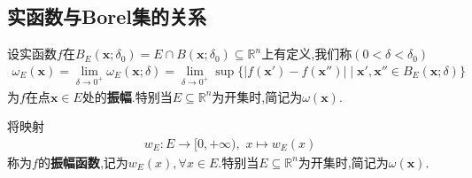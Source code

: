 \documentclass[../../main.tex]{subfiles}%
\begin{document}
\subsection{实函数与Borel集的关系}

\begin{definition}[振幅函数]\label{definition:振幅函数}
设实函数$f$在$B_E(\boldsymbol{x};\delta_0)=E\cap B(\boldsymbol{x};\delta_0)\subseteq\mathbb{R}^n$上有定义,我们称$(0<\delta<\delta_0)$
\begin{align*}
\omega_E(\boldsymbol{x})=\lim\limits_{\delta\to0^+}\omega_E(\boldsymbol{x};\delta)
=\lim\limits_{\delta\to0^+}\sup\{|f(\boldsymbol{x}')-f(\boldsymbol{x}'')|\mid \boldsymbol{x}',\boldsymbol{x}''\in B_E(\boldsymbol{x};\delta)\}
\end{align*}
为$f$在点$\boldsymbol{x}\in E$处的\textbf{振幅}.特别当$E\subseteq\mathbb{R}^n$为开集时,简记为$\omega(\boldsymbol{x})$.

将映射
\begin{align*}
w_E:E\to [0,+\infty),\,\,x\mapsto w_E(x)
\end{align*}
称为$f$的\textbf{振幅函数},记为$w_E(x),\forall x\in E$.特别当$E\subseteq\mathbb{R}^n$为开集时,简记为$\omega(\boldsymbol{x})$.

\end{definition}
\end{document}
